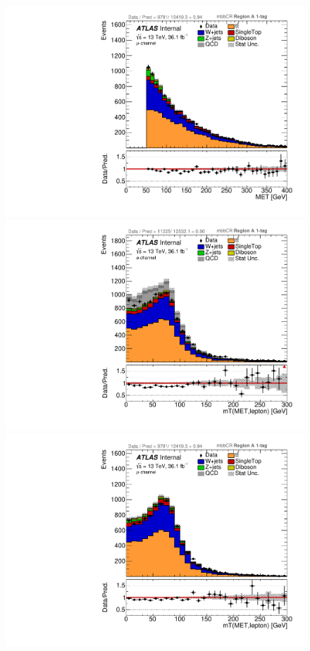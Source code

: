 \begin{figure}[!htbp]
\begin{center}
\includegraphics[scale=0.33]{./figures/boosted/ABCD_1tag0bjet/muon_mbbcr_RegionA_MET_withDD}  \\
\includegraphics[scale=0.33]{./figures/boosted/ABCD_1tag0bjet/elec_mbbcr_RegionA_WlepMtATLAS_withDD}
\includegraphics[scale=0.33]{./figures/boosted/ABCD_1tag0bjet/muon_mbbcr_RegionA_WlepMtATLAS_withDD}\\

\end{center}
\end{figure}
